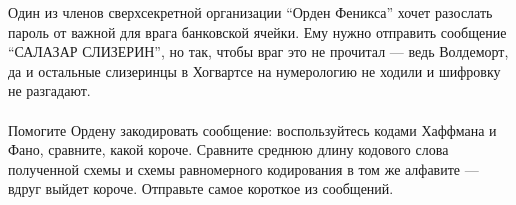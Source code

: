 \question
Один из членов сверхсекретной организации “Орден Феникса” хочет разослать пароль от важной для врага банковской ячейки. Ему нужно отправить сообщение “САЛАЗАР СЛИЗЕРИН”, но так, чтобы враг это не прочитал — ведь Волдеморт, да и остальные слизеринцы в Хогвартсе на нумерологию не ходили и шифровку не разгадают.
\\
\\
Помогите Ордену закодировать сообщение: воспользуйтесь кодами Хаффмана и Фано, сравните, какой короче. Сравните среднюю длину кодового слова полученной схемы и схемы равномерного кодирования в том же алфавите — вдруг выйдет короче. Отправьте самое короткое из сообщений.